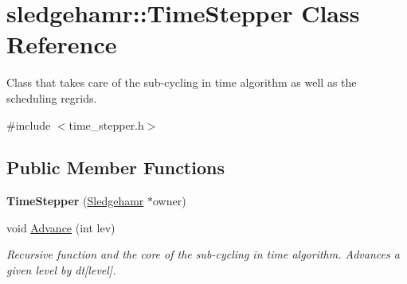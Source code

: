 \hypertarget{classsledgehamr_1_1TimeStepper}{}\section{sledgehamr\+:\+:Time\+Stepper Class Reference}
\label{classsledgehamr_1_1TimeStepper}


Class that takes care of the sub-\/cycling in time algorithm as well as the scheduling regrids.  




{\ttfamily \#include $<$time\+\_\+stepper.\+h$>$}

\subsection*{Public Member Functions}
\begin{DoxyCompactItemize}
\item 
\mbox{\label{classsledgehamr_1_1TimeStepper_a3e07dcb8a5a92cd4a10b8e3e34f5ce57}} 
{\bfseries Time\+Stepper} (\mbox{\hyperlink{classsledgehamr_1_1Sledgehamr}{Sledgehamr}} $\ast$owner)
\item 
void \mbox{\hyperlink{classsledgehamr_1_1TimeStepper_a029f92dcddadc58f020a528cd93da35d}{Advance}} (int lev)
\begin{DoxyCompactList}\small\item\em Recursive function and the core of the sub-\/cycling in time algorithm. Advances a given level by dt\mbox{[}level\mbox{]}. \end{DoxyCompactList}\end{DoxyCompactItemize}
